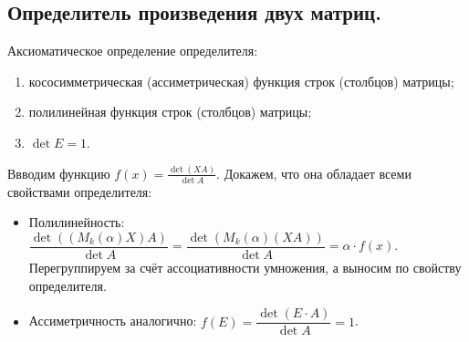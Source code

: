 \documentclass[a4paper,14pt]{article}
\begin{document}
\subsection{Определитель произведения двух матриц.}
\noindent Аксиоматическое определение определителя:
\begin{enumerate}
	\item кососимметрическая (ассиметрическая) функция строк (столбцов) матрицы;
	\item полилинейная функция строк (столбцов) матрицы;
	\item $\det E = 1$.
\end{enumerate}
\noindent Ввводим функцию $f(x) = \frac{\det (XA)}{\det A}$. Докажем, что она обладает всеми свойствами определителя:
\begin{itemize}
	\item Полилинейность: $\dfrac{\det ((M_k(\alpha)X)A)}{\det A} = \dfrac{\det (M_k(\alpha)(XA))}{\det A} = \alpha \cdot f(x)$. Перегруппируем за счёт ассоциативности умножения, а выносим по свойству определителя.
	\item Ассиметричность аналогично: $f(E) = \dfrac{\det (E \cdot A)}{\det A} = 1$.
\end{itemize}
\end{document}
